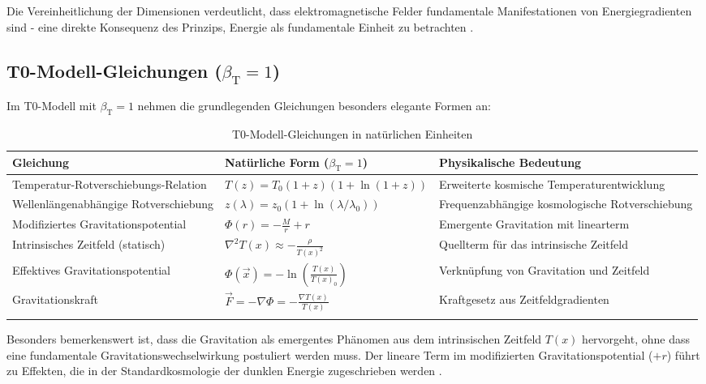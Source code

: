 \documentclass[12pt,a4paper]{article}
\newcommand{\Tfield}{T(x)}
\newcommand{\betaT}{\beta_{\text{T}}}
\begin{document}
	Die Vereinheitlichung der Dimensionen verdeutlicht, dass elektromagnetische Felder fundamentale Manifestationen von Energiegradienten sind - eine direkte Konsequenz des Prinzips, Energie als fundamentale Einheit zu betrachten \cite{pascher_alpha_2025}.
	
	\subsection{T0-Modell-Gleichungen ($\betaT = 1$)}
	
	Im T0-Modell mit $\betaT = 1$ nehmen die grundlegenden Gleichungen besonders elegante Formen an:
	
	\begin{table}[ht]
		\centering
		\begin{adjustbox}{scale=0.70}
			\begin{tabular}{lll}
				\hline
				\textbf{Gleichung} & \textbf{Natürliche Form ($\betaT = 1$)} & \textbf{Physikalische Bedeutung} \\
				\hline
				Temperatur-Rotverschiebungs-Relation & $T(z) = T_0(1+z)(1+\ln(1+z))$ & Erweiterte kosmische Temperaturentwicklung \\
				Wellenlängenabhängige Rotverschiebung & $z(\lambda) = z_0(1+\ln(\lambda/\lambda_0))$ & Frequenzabhängige kosmologische Rotverschiebung \\
				Modifiziertes Gravitationspotential & $\Phi(r) = -\frac{M}{r} + r$ & Emergente Gravitation mit linearterm \\
				Intrinsisches Zeitfeld (statisch) & $\nabla^2\Tfield \approx -\frac{\rho}{\Tfield^2}$ & Quellterm für das intrinsische Zeitfeld \\
				Effektives Gravitationspotential & $\Phi(\vec{x}) = -\ln\left(\frac{\Tfield}{\Tfield_0}\right)$ & Verknüpfung von Gravitation und Zeitfeld \\
				Gravitationskraft & $\vec{F} = -\nabla\Phi = -\frac{\nabla\Tfield}{\Tfield}$ & Kraftgesetz aus Zeitfeldgradienten \\
				\hline
			\multicolumn{2}{c}{} \\
				\hline
			\end{tabular}
		\end{adjustbox}
		\caption{T0-Modell-Gleichungen in natürlichen Einheiten }
		\label{tab:t0_equations}
	\end{table}
	
	Besonders bemerkenswert ist, dass die Gravitation als emergentes Phänomen aus dem intrinsischen Zeitfeld $\Tfield$ hervorgeht, ohne dass eine fundamentale Gravitationswechselwirkung postuliert werden muss. Der lineare Term im modifizierten Gravitationspotential ($+r$) führt zu Effekten, die in der Standardkosmologie der dunklen Energie zugeschrieben werden \cite{pascher_emergente_2025}.
	
\end{document}
